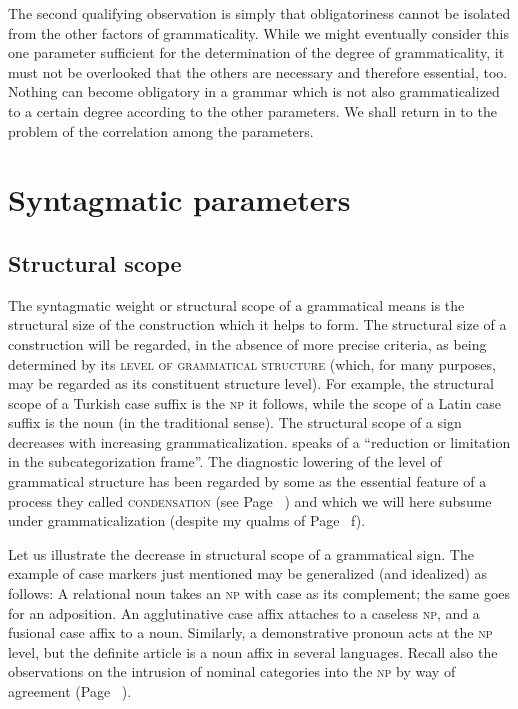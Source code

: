 The second qualifying observation is simply that obligatoriness cannot be isolated from the other factors of grammaticality. While we might eventually consider this one parameter sufficient for the determination of the degree of grammaticality, it must not be overlooked that the others are necessary and therefore essential, too. Nothing can become obligatory in a grammar which is not also grammaticalized to a certain degree according to the other parameters. We shall return in  to the problem of the correlation among the parameters.

\section{Syntagmatic parameters} \label{sec:4.3}
\subsection{Structural scope} \label{sec:4.3.1}

The syntagmatic weight or structural scope of a grammatical means is the structural size of the construction which it helps to form. The structural size of a construction will be regarded, in the absence of more precise criteria, as being determined by its \textsc{level of grammatical structure} (which, for many purposes, may be regarded as its constituent structure level). For example, the structural scope of a Turkish case suffix is the \textsc{np} it follows, while the scope of a Latin case suffix is the noun (in the traditional sense). The structural scope of a sign decreases with increasing grammaticalization. \citet[56f]{Vincent1980b} speaks of a “reduction or limitation in the subcategorization frame”. The diagnostic lowering of the level of grammatical structure has been regarded by some as the essential feature of a process they called \textsc{condensation} (see Page~\pageref{page12}\chk%
) and which we will here subsume under grammaticalization (despite my qualms of Page~\pageref{page12b}\chk%
f).

Let us illustrate the decrease in structural scope of a grammatical sign. The example of case markers just mentioned may be generalized (and idealized) as follows: A relational noun takes an \textsc{np} with case as its complement; the same goes for an adposition. An agglutinative case affix attaches to a caseless \textsc{np}, and a fusional case affix to a noun. Similarly, a demonstrative pronoun acts at the \textsc{np} level, but the definite article is a noun affix in several languages. Recall also the observations on the intrusion of nominal categories into the \textsc{np} by way of agreement (Page~\pageref{page63}\chk%
).

